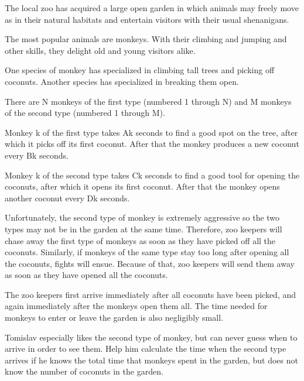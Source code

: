 The local zoo has acquired a large open garden in which animals may freely move as in their natural habitats and entertain visitors with their usual shenanigans.  

   The most popular animals are monkeys. With their climbing and jumping and other skills, they delight old and young visitors alike.  

   One species of monkey has specialized in climbing tall trees and picking off coconuts. Another species has specialized in breaking them open.  

   There are N monkeys of the first type (numbered 1 through N) and M monkeys of the second type (numbered 1 through M).  

   Monkey k of the first type takes Ak seconds to find a good spot on the tree, after which it picks off its first coconut. After that the monkey produces a new coconut every Bk seconds.  

   Monkey k of the second type takes Ck seconds to find a good tool for opening the coconuts, after which it opens its first coconut. After that the monkey opens another coconut every Dk seconds.  

   Unfortunately, the second type of monkey is extremely aggressive so the two types may not be in the garden at the same time. Therefore, zoo keepers will chase away the first type of monkeys as soon as they have picked off all the coconuts. Similarly, if monkeys of the same type stay too long after opening all the coconuts, fights will ensue. Because of that, zoo keepers will send them away as soon as they have opened all the coconuts.  

   The zoo keepers first arrive immediately after all coconuts have been picked, and again immediately after the monkeys open them all. The time needed for monkeys to enter or leave the garden is also negligibly small.  

   Tomislav especially likes the second type of monkey, but can never guess when to arrive in order to see them. Help him calculate the time when the second type arrives if he knows the total time that monkeys spent in the garden, but does not know the number of coconuts in the garden.